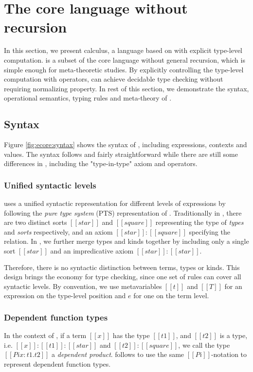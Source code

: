 \section{The core language without recursion}\label{sec:ecore}

In this section, we present \ecore calculus, a language based on \cc with explicit type-level computation. \ecore is a subset of the core language \name without general recursion, which is simple enough for meta-theoretic studies. By explicitly controlling the type-level computation with \cast operators, \ecore can achieve decidable type checking without requiring normalizing property. In rest of this section, we demonstrate the syntax, operational semantics, typing rules and meta-theory of \ecore.

\subsection{Syntax}\label{sec:ecore:syn}
Figure \ref{fig:ecore:syntax} shows the syntax of \ecore, including expressions, contexts and values. The syntax follows \cc and fairly straightforward while there are still some differences in \ecore, including the "type-in-type" axiom and \cast operators.

\subsubsection{Unified syntactic levels}
\ecore uses a unified syntactic representation for different levels of expressions by following the \emph{pure type system} (PTS) representation of \cc. Traditionally in \cc, there are two distinct sorts $[[star]]$ and $[[square]]$ representing the type of \emph{types} and \emph{sorts} respectively, and an axiom $[[star]]:[[square]]$ specifying the relation. In \ecore, we further merge types and kinds together by including only a single sort $[[star]]$ and an impredicative axiom $[[star]]:[[star]]$. 

Therefore, there is no syntactic distinction between terms, types or kinds. This design brings the economy for type checking, since one set of rules can cover all syntactic levels. By convention, we use metavariables $[[t]]$ and $[[T]]$ for an expression on the type-level position and $e$ for one on the term level.

\subsubsection{Dependent function types}
In the context of \cc, if a term $[[x]]$ has the type $[[t1]]$, and $[[t2]]$ is a type, i.e. $[[x]]:[[t1]]:[[star]]$ and $[[t2]]:[[square]]$, we call the type $[[Pi x:t1.t2]]$ a \emph{dependent product}. \ecore follows \cc to use the same $[[Pi]]$-notation to represent dependent function types.

